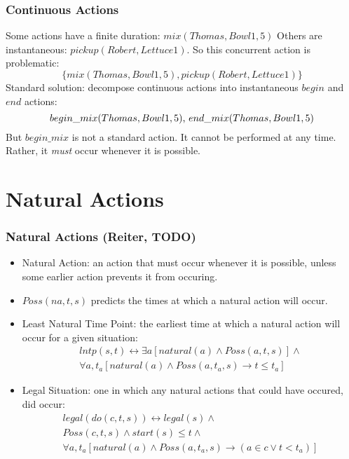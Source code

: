 \documentclass{beamer}
\begin{document}
\begin{frame}
\frametitle{Continuous Actions}
Some actions have a finite duration: $mix(Thomas,Bowl1,5)$
Others are instantaneous: $pickup(Robert,Lettuce1)$.
So this concurrent action is problematic:\[
\{mix(Thomas,Bowl1,5),pickup(Robert,Lettuce1)\}\]
Standard solution: decompose continuous actions into instantaneous $begin$ 
and $end$ actions:\[
begin\_mix(Thomas,Bowl1,5)$, $end\_mix(Thomas,Bowl1,5)\]
But $begin\_mix$ is not a standard action.  It cannot be performed at
any time.  Rather, it \emph{must} occur whenever it is possible.
\end{frame}

\section{Natural Actions}

\begin{frame}
\frametitle{Natural Actions (Reiter, TODO)}
\begin{itemize}
  \item Natural Action:  an action that must occur whenever it is possible,
        unless some earlier action prevents it from occuring.
  \item $Poss(na,t,s)$ predicts the times at which a natural action will occur.
  \item Least Natural Time Point: the earliest time at which a natural
        action will occur for a given situation:\[
\begin{array}{c}
lntp(s,t) \leftrightarrow \exists a [natural(a) \wedge Poss(a,t,s)] \wedge\\
\forall a,t_a [natural(a) \wedge Poss(a,t_a,s) \rightarrow t \leq t_a]
\end{array}\]
  \item Legal Situation: one in which any natural actions that could have occured, did occur:\[
\begin{array}{c}
legal(do(c,t,s)) \leftrightarrow legal(s) \wedge\\
Poss(c,t,s) \wedge start(s) \leq t \wedge\\
\forall a,t_a [natural(a) \wedge Poss(a,t_a,s) \rightarrow (a \in c \vee t < t_a)]
\end{array}\]
\end{itemize}
\end{frame}
\end{document}
